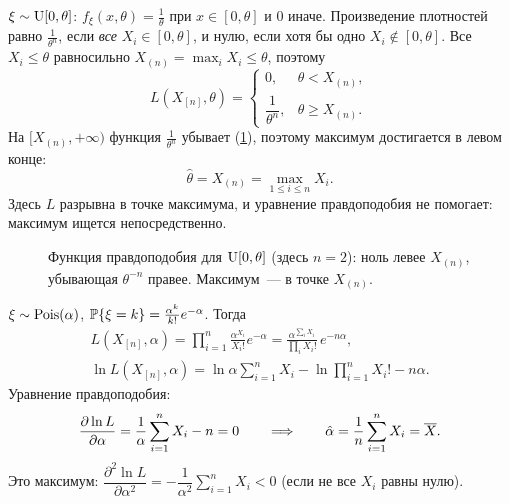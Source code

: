 \begin{example}
  \label{lec07:ex:mle-unif}
  $\xi \sim \Unif[0, \theta]$: $f_\xi(x, \theta) = \frac1\theta$ при $x \in [0, \theta]$
  и $0$ иначе. Произведение плотностей равно $\frac{1}{\theta^n}$, если \emph{все}
  $X_i \in [0, \theta]$, и нулю, если хотя бы одно $X_i \notin [0, \theta]$.
  Все $X_i \le \theta$ равносильно $X_{(n)} = \max_i X_i \le \theta$, поэтому
  \[
    L(X_{[n]}, \theta) =
    \begin{cases}
      0,                  & \theta < X_{(n)}, \\
      \dfrac{1}{\theta^n}, & \theta \ge X_{(n)}.
    \end{cases}
  \]
  На $[X_{(n)}, +\infty)$ функция $\frac{1}{\theta^n}$ убывает (\cref{lec07:fig:unif-L}),
  поэтому максимум достигается в левом конце:
  \[
    \hat\theta = X_{(n)} = \max_{1 \le i \le n} X_i.
  \]
  Здесь $L$ разрывна в точке максимума, и уравнение правдоподобия не помогает:
  максимум ищется непосредственно.
\end{example}

\begin{figure}[h]
  \centering
  \caption{Функция правдоподобия для $\Unif[0, \theta]$ (здесь $n = 2$): ноль левее $X_{(n)}$,
           убывающая $\theta^{-n}$ правее. Максимум~--- в точке $X_{(n)}$.}
  \label{lec07:fig:unif-L}
\end{figure}

\begin{example}
  \label{lec07:ex:mle-pois}
  $\xi \sim \Pois(\alpha)$, $\P\{\xi = k\} = \frac{\alpha^k}{k!} e^{-\alpha}$. Тогда
  \begin{gather*}
    L(X_{[n]}, \alpha) = \prod_{i=1}^n \frac{\alpha^{X_i}}{X_i!} e^{-\alpha}
      = \frac{\alpha^{\sum_i X_i}}{\prod_i X_i!}\, e^{-n\alpha}, \\
    \ln L(X_{[n]}, \alpha) = \ln\alpha \sum_{i=1}^n X_i - \ln \prod_{i=1}^n X_i! - n\alpha.
  \end{gather*}
  Уравнение правдоподобия:
  \[
    \frac{\partial \ln L}{\partial \alpha} = \frac{1}{\alpha} \sum_{i=1}^n X_i - n = 0
    \qquad\Longrightarrow\qquad
    \hat\alpha = \frac1n \sum_{i=1}^n X_i = \Xbar.
  \]
  Это максимум: $\dfrac{\partial^2 \ln L}{\partial \alpha^2} = -\dfrac{1}{\alpha^2} \sum_{i=1}^n X_i < 0$
  (если не все $X_i$ равны нулю).
\end{example}

